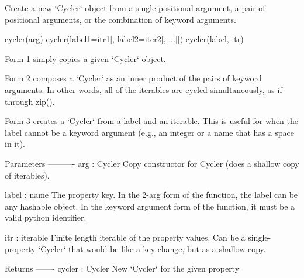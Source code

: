 \begin{DoxyVerb}Create a new `Cycler` object from a single positional argument,
a pair of positional arguments, or the combination of keyword arguments.

cycler(arg)
cycler(label1=itr1[, label2=iter2[, ...]])
cycler(label, itr)

Form 1 simply copies a given `Cycler` object.

Form 2 composes a `Cycler` as an inner product of the
pairs of keyword arguments. In other words, all of the
iterables are cycled simultaneously, as if through zip().

Form 3 creates a `Cycler` from a label and an iterable.
This is useful for when the label cannot be a keyword argument
(e.g., an integer or a name that has a space in it).

Parameters
----------
arg : Cycler
    Copy constructor for Cycler (does a shallow copy of iterables).

label : name
    The property key. In the 2-arg form of the function,
    the label can be any hashable object. In the keyword argument
    form of the function, it must be a valid python identifier.

itr : iterable
    Finite length iterable of the property values.
    Can be a single-property `Cycler` that would
    be like a key change, but as a shallow copy.

Returns
-------
cycler : Cycler
    New `Cycler` for the given property\end{DoxyVerb}
 